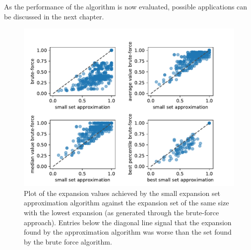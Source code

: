 As the performance of the algorithm is now evaluated, possible applications can be discussed in the next chapter.


\begin{figure}
	\centering
	\includegraphics[scale=1]{figures/quality_evaluation_log_expansion_values_for_same_number_verticies.pdf}
	\caption[Plot expansions approximation against brute force]{Plot of the expansion values achieved by the small expansion set approximation algorithm against the expansion set of the same size with the lowest expansion (as generated through the brute-force approach). Entries below the diagonal line signal that the expansion found by the approximation algorithm was worse than the set found by the brute force algorithm. \label{fig:expansion_approx_vs_brute}}
\end{figure}




